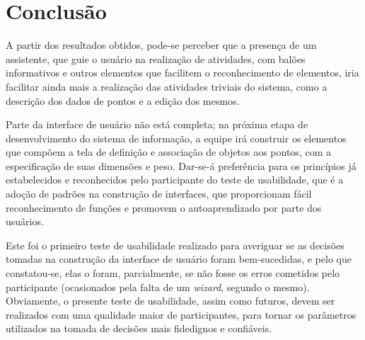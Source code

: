 \documentclass[
	article,
	11pt,
	oneside,
	a4paper,
	english,
	brazil,
	sumario=tradicional
]{abntex2}
\begin{document}
\section*{Conclusão}
	
	A partir dos resultados obtidos, pode-se perceber que a presença de um assistente, que guie o usuário na realização de atividades, com balões informativos e outros elementos que facilitem o reconhecimento de elementos, iria facilitar ainda mais a realização das atividades triviais do sistema, como a descrição dos dados de pontos e a edição dos mesmos.
	
	Parte da interface de usuário não está completa; na próxima etapa de desenvolvimento do sistema de informação, a equipe irá construir os elementos que compõem a tela de definição e associação de objetos aos pontos, com a especificação de suas dimensões e peso. Dar-se-á preferência para os princípios já estabelecidos e reconhecidos pelo participante do teste de usabilidade, que é a adoção de padrões na construção de interfaces, que proporcionam fácil reconhecimento de funções e promovem o autoaprendizado por parte dos usuários.
	
	Este foi o primeiro teste de usabilidade realizado para averiguar se as decisões tomadas na construção da interface de usuário foram bem-sucedidas, e pelo que constatou-se, elas o foram, parcialmente, se não fosse os erros cometidos pelo participante (ocasionados pela falta de um \textit{wizard}, segundo o mesmo). Obviamente, o presente teste de usabilidade, assim como futuros, devem ser realizados com uma qualidade maior de participantes, para tornar os parâmetros utilizados na tomada de decisões mais fidedignos e confiáveis.

\vspace*{\fill}
\pagebreak

 

\end{document}
